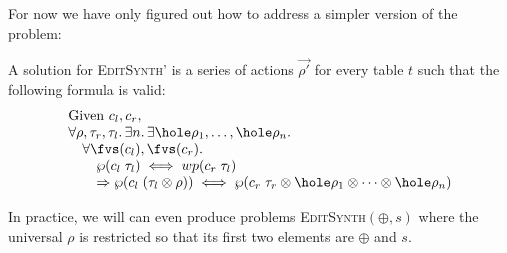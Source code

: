 For now we have only figured out how to address a simpler version of the
problem:

A solution for \textsc{EditSynth'} is a series of actions $\vec{\rho'}$ for every table $t$ such that
the following formula is valid:
\[\begin{array}{l}
    \text{Given } c_l,c_r, \\
    \forall \rho, \tau_r, \tau_l.\, \exists n.\, \exists \hole\rho_1,\ldots,\hole\rho_n. \\ 
    \quad \forall \fvs(c_l), \fvs(c_r). \\
    \qquad \wp(c_l\; \tau_l) \iff wp(c_r\; \tau_l) \\
    \qquad \Rightarrow \wp(c_l\; (\tau_l \otimes \rho)) \iff \wp(c_r\; \tau_r
    \otimes \hole\rho_1 \otimes \cdots \otimes \hole\rho_n )
  \end{array}\]

In practice, we will can even produce problems \textsc{EditSynth}$(\oplus,s)$
where the universal $\rho$ is restricted so that its first two elements are
$\oplus$ and $s$.